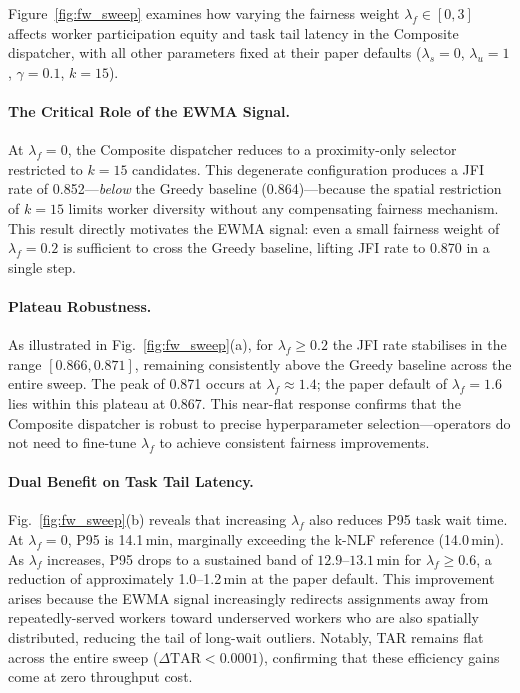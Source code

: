 Figure~\ref{fig:fw_sweep} examines how varying the fairness weight
$\lambda_f \in [0, 3]$ affects worker participation equity and task tail
latency in the Composite dispatcher, with all other parameters fixed at
their paper defaults ($\lambda_s{=}0$, $\lambda_u{=}1$, $\gamma{=}0.1$,
$k{=}15$).

\paragraph{The Critical Role of the EWMA Signal.}
At $\lambda_f{=}0$, the Composite dispatcher reduces to a
proximity-only selector restricted to $k{=}15$ candidates. This
degenerate configuration produces a JFI rate of 0.852---\textit{below}
the Greedy baseline (0.864)---because the spatial restriction of
$k{=}15$ limits worker diversity without any compensating fairness
mechanism. This result directly motivates the EWMA signal: even a small
fairness weight of $\lambda_f{=}0.2$ is sufficient to cross the Greedy
baseline, lifting JFI rate to 0.870 in a single step.

\paragraph{Plateau Robustness.}
As illustrated in Fig.~\ref{fig:fw_sweep}(a), for $\lambda_f \geq 0.2$
the JFI rate stabilises in the range $[0.866, 0.871]$, remaining
consistently above the Greedy baseline across the entire sweep. The
peak of 0.871 occurs at $\lambda_f \approx 1.4$; the paper default of
$\lambda_f{=}1.6$ lies within this plateau at 0.867. This near-flat
response confirms that the Composite dispatcher is robust to precise
hyperparameter selection---operators do not need to fine-tune
$\lambda_f$ to achieve consistent fairness improvements.

\paragraph{Dual Benefit on Task Tail Latency.}
Fig.~\ref{fig:fw_sweep}(b) reveals that increasing $\lambda_f$ also
reduces P95 task wait time. At $\lambda_f{=}0$, P95 is 14.1\,min,
marginally exceeding the k-NLF reference (14.0\,min). As $\lambda_f$
increases, P95 drops to a sustained band of $12.9$--$13.1$\,min for
$\lambda_f \geq 0.6$, a reduction of approximately 1.0--1.2\,min at
the paper default. This improvement arises because the EWMA signal
increasingly redirects assignments away from repeatedly-served workers
toward underserved workers who are also spatially distributed, reducing
the tail of long-wait outliers. Notably, TAR remains flat across the
entire sweep ($\Delta\text{TAR} < 0.0001$), confirming that these
efficiency gains come at zero throughput cost.


